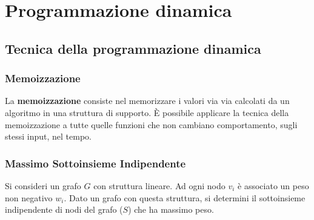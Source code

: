 \documentclass[11pt]{article}
\begin{document}
\section{Programmazione dinamica}
\subsection{Tecnica della programmazione dinamica}
\subsubsection{Memoizzazione}
La \textbf{memoizzazione} consiste nel memorizzare i valori via via calcolati da un algoritmo in una struttura di supporto.
È possibile applicare la tecnica della memoizzazione a tutte quelle funzioni che non cambiano comportamento, sugli stessi 
input, nel tempo.
\subsubsection{Massimo Sottoinsieme Indipendente}
Si consideri un grafo $G$ con struttura lineare. Ad ogni nodo $v_i$ è associato un peso non negativo $w_i$. 
Dato un grafo con questa struttura, si determini il sottoinsieme indipendente di nodi del grafo ($S$) che ha massimo peso. 
\end{document}
